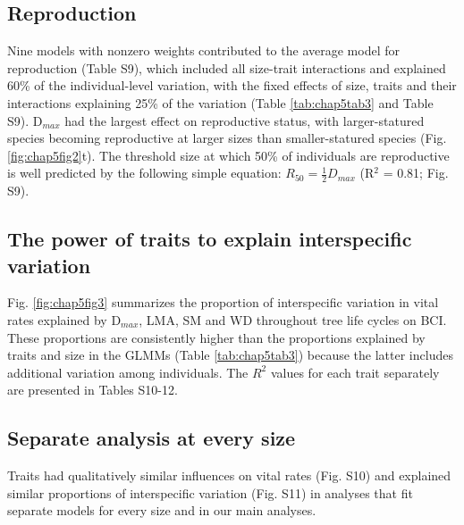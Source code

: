 \documentclass[b5paper,justified]{tufte-book} %
\begin{document}
\begin{fullwidth}
\subsection{Reproduction}
Nine models with nonzero weights contributed to the average model for reproduction (Table S9), which included all
size-trait interactions and explained 60\% of the individual-level variation, with the fixed effects of size, traits and their interactions explaining 25\% of the variation (Table \ref{tab:chap5tab3} and Table S9). D$_{max}$ had the largest effect on reproductive status, with larger-statured species becoming reproductive at larger sizes than smaller-statured species (Fig. \ref{fig:chap5fig2}t). The threshold size at which 50\% of individuals are reproductive is well predicted by the following simple equation: $R_{50} = \frac{1}{2} D_{max}$ (R$^2$ = 0.81; Fig. S9).

\subsection{The power of traits to explain interspecific variation}
Fig. \ref{fig:chap5fig3} summarizes the proportion of interspecific variation in vital rates explained by D$_{max}$, LMA, SM and WD throughout tree life cycles on BCI. These proportions are consistently higher than the proportions explained by traits and size in the GLMMs (Table \ref{tab:chap5tab3}) because the latter includes additional variation among individuals. The $R^2$ values for each trait separately are presented in Tables S10-12.

\subsection{Separate analysis at every size}
Traits had qualitatively similar influences on vital rates (Fig. S10) and explained similar proportions of interspecific variation (Fig. S11) in analyses that fit separate models for every size and in our main analyses.


\end{fullwidth}
\end{document}
